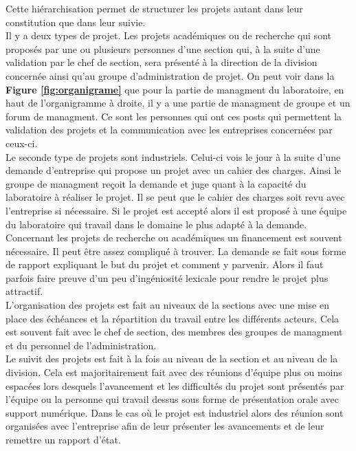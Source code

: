 \documentclass[12pt]{article}
\theoremstyle{plain}
\theoremstyle{remark}
\begin{document}
Cette hiérarchisation permet de structurer les projets autant dans leur constitution que dans leur suivie. \\ 
Il y a deux types de projet. Les projets académiques ou de recherche qui sont proposés par une ou plusieurs personnes d'une section qui, à la suite d'une validation par le chef de section, sera présenté à la direction de la division concernée ainsi qu'au groupe d'administration de projet. On peut voir dans la \textbf{Figure \ref{fig:organigrame}} que pour la partie de managment du laboratoire, en haut de l'organigramme à droite, il y a une partie de managment de groupe et un forum de managment. Ce sont les personnes qui ont ces posts qui permettent la validation des projets et la communication avec les entreprises concernées par ceux-ci. \\
Le seconde type de projets sont industriels. Celui-ci vois le jour à la suite d'une demande d'entreprise qui propose un projet avec un cahier des charges. Ainsi le groupe de managment reçoit la demande et juge quant à la capacité du laboratoire à réaliser le projet. Il se peut que le cahier des charges soit revu avec l'entreprise si nécessaire. Si le projet est accepté alors il est proposé à une équipe du laboratoire qui travail dans le domaine le plus adapté à la demande. \\
Concernant les projets de recherche ou académiques un financement est souvent nécessaire. Il peut être assez compliqué à trouver. La demande se fait sous forme de rapport expliquant le but du projet et comment y parvenir. Alors il faut parfois faire preuve d'un peu d'ingéniosité lexicale pour rendre le projet plus attractif. \\

L'organisation des projets est fait au niveaux de la sections avec une mise en place des échéances et la répartition du travail entre les différents acteurs. Cela est souvent fait avec le chef de section, des membres des groupes de managment et du personnel de l'administration.\\

Le suivit des projets est fait à la fois au niveau de la section et au niveau de la division. Cela est majoritairement fait avec des réunions d'équipe plus ou moins espacées lors desquels l'avancement et les difficultés du projet sont présentés par l'équipe ou la personne qui travail dessus sous forme de présentation orale avec support numérique. Dans le cas où le projet est industriel alors des réunion sont organisées avec l'entreprise afin de leur présenter les avancements et de leur remettre un rapport d'état.



\pagebreak


	
	
\end{document}
